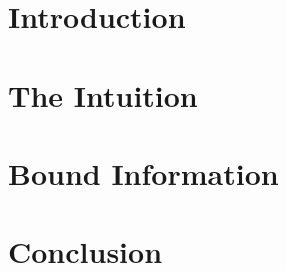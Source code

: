 \documentclass[titlepage]{report}
\begin{document}

\tableofcontents

\chapter{Introduction}

		
\chapter{The Intuition}

		
\chapter{Bound Information}

	
\chapter{Conclusion}


%
\printbibliography
\end{document}
